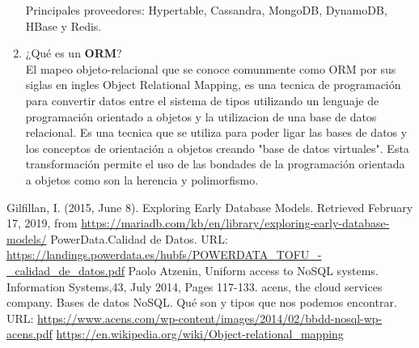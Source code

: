 \documentclass[10pt]{article}
\begin{document}
\begin{enumerate}[label=\alph*.]
            Principales proveedores: Hypertable, Cassandra, MongoDB, DynamoDB, HBase y Redis.\\
            
            \item ¿Qué es un \textbf{ORM}?\\
            El mapeo objeto-relacional que se conoce comunmente como ORM por sus siglas en ingles Object Relational Mapping, es una tecnica de programación para convertir datos entre el sistema de tipos  utilizando un lenguaje de programación orientado a objetos y la utilizacion de una base de datos relacional. Es una tecnica que se utiliza para poder ligar las bases de datos  y los conceptos de orientación a objetos creando "base de datos virtuales".   Esta
            transformación permite el uso de las bondades de la programación orientada a objetos como son la herencia y polimorfismo. \cite{orm}\\
        \end{enumerate}

  
    \begin{thebibliography}{}
            Gilfillan, I. (2015, June 8). Exploring Early Database Models. 
            Retrieved February 17, 2019, from 
            \href{https://mariadb.com/kb/en/library/exploring-early-database-models/}
            {https://mariadb.com/kb/en/library/exploring-early-database-models/}
             PowerData.Calidad de Datos. URL: \url{https://landings.powerdata.es/hubfs/POWERDATA_TOFU_-_calidad_de_datos.pdf}
             Paolo Atzenin, Uniform access to NoSQL systems. Information Systems,43, July 2014, Pages 117-133.
            acens, the cloud services company. Bases de datos NoSQL. Qué son y tipos que nos podemos encontrar. URL: \url{https://www.acens.com/wp-content/images/2014/02/bbdd-nosql-wp-acens.pdf}
             \url{https://en.wikipedia.org/wiki/Object-relational_mapping}
    \end{thebibliography}
\end{document}
